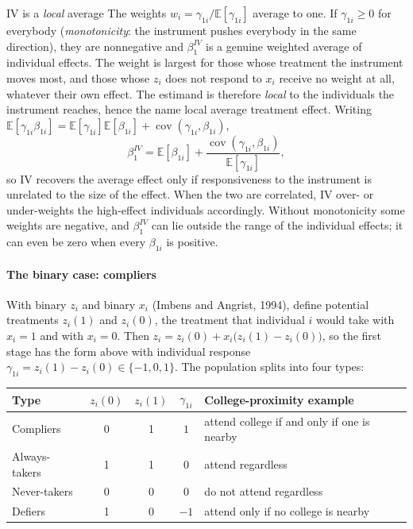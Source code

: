 \documentclass[11pt,a4paper]{article}
\newcommand{\E}{\mathbb{E}}
\newcommand{\Cov}{\operatorname{cov}}
\begin{document}
\begin{whybox}{IV is a \emph{local} average}
The weights $w_i=\gamma_{1i}/\E[\gamma_{1i}]$ average to one. If $\gamma_{1i}\geq0$ for everybody (\emph{monotonicity}: the instrument pushes everybody in the same direction), they are nonnegative and $\beta_1^{IV}$ is a genuine weighted average of individual effects. The weight is largest for those whose treatment the instrument moves most, and those whose $z_i$ does not respond to $x_i$ receive no weight at all, whatever their own effect. The estimand is therefore \emph{local} to the individuals the instrument reaches, hence the name local average treatment effect. Writing $\E[\gamma_{1i}\beta_{1i}]=\E[\gamma_{1i}]\E[\beta_{1i}]+\Cov(\gamma_{1i},\beta_{1i})$,
\[
\beta_1^{IV}=\E[\beta_{1i}]+\frac{\Cov(\gamma_{1i},\beta_{1i})}{\E[\gamma_{1i}]},
\]
so IV recovers the average effect only if responsiveness to the instrument is unrelated to the size of the effect. When the two are correlated, IV over- or under-weights the high-effect individuals accordingly. Without monotonicity some weights are negative, and $\beta_1^{IV}$ can lie outside the range of the individual effects; it can even be zero when every $\beta_{1i}$ is positive.
\end{whybox}

\paragraph{The binary case: compliers}
With binary $z_i$ and binary $x_i$ (Imbens and Angrist, 1994), define potential treatments $z_i(1)$ and $z_i(0)$, the treatment that individual $i$ would take with $x_i=1$ and with $x_i=0$. Then $z_i=z_i(0)+x_i\big(z_i(1)-z_i(0)\big)$, so the first stage has the form above with individual response $\gamma_{1i}=z_i(1)-z_i(0)\in\{-1,0,1\}$. The population splits into four types:

\begin{table}[h]
\centering\small
\begin{tabular}{@{}lcccl@{}}
\toprule
Type & $z_i(0)$ & $z_i(1)$ & $\gamma_{1i}$ & College-proximity example \\
\midrule
Compliers & 0 & 1 & $1$ & attend college if and only if one is nearby \\
Always-takers & 1 & 1 & $0$ & attend regardless \\
Never-takers & 0 & 0 & $0$ & do not attend regardless \\
Defiers & 1 & 0 & $-1$ & attend only if no college is nearby \\
\bottomrule
\end{tabular}
\end{table}
\end{document}
